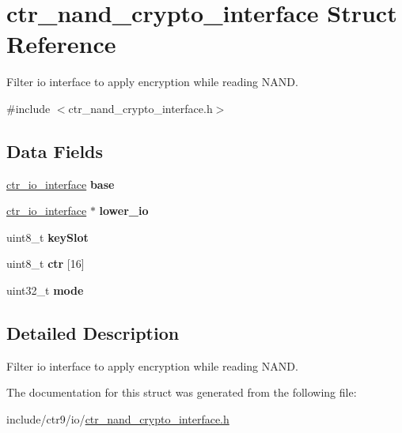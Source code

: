 \hypertarget{structctr__nand__crypto__interface}{}\section{ctr\+\_\+nand\+\_\+crypto\+\_\+interface Struct Reference}
\label{structctr__nand__crypto__interface}


Filter io interface to apply encryption while reading N\+A\+ND.  




{\ttfamily \#include $<$ctr\+\_\+nand\+\_\+crypto\+\_\+interface.\+h$>$}

\subsection*{Data Fields}
\begin{DoxyCompactItemize}
\item 
\hyperlink{structctr__io__interface}{ctr\+\_\+io\+\_\+interface} {\bfseries base}\hypertarget{structctr__nand__crypto__interface_a00beb8fda8579fcca305932851dc5696}{}\label{structctr__nand__crypto__interface_a00beb8fda8579fcca305932851dc5696}

\item 
\hyperlink{structctr__io__interface}{ctr\+\_\+io\+\_\+interface} $\ast$ {\bfseries lower\+\_\+io}\hypertarget{structctr__nand__crypto__interface_ac9983e8b6543700f100d745d3a94b703}{}\label{structctr__nand__crypto__interface_ac9983e8b6543700f100d745d3a94b703}

\item 
uint8\+\_\+t {\bfseries key\+Slot}\hypertarget{structctr__nand__crypto__interface_acb43bd125f01ea593afffcc15c3309f2}{}\label{structctr__nand__crypto__interface_acb43bd125f01ea593afffcc15c3309f2}

\item 
uint8\+\_\+t {\bfseries ctr} \mbox{[}16\mbox{]}\hypertarget{structctr__nand__crypto__interface_ab1f4bd9288bb760cbfbb5bbb3ee6ed69}{}\label{structctr__nand__crypto__interface_ab1f4bd9288bb760cbfbb5bbb3ee6ed69}

\item 
uint32\+\_\+t {\bfseries mode}\hypertarget{structctr__nand__crypto__interface_a089f09af071d62d3f1650aa904ae8e8c}{}\label{structctr__nand__crypto__interface_a089f09af071d62d3f1650aa904ae8e8c}

\end{DoxyCompactItemize}


\subsection{Detailed Description}
Filter io interface to apply encryption while reading N\+A\+ND. 

The documentation for this struct was generated from the following file\+:\begin{DoxyCompactItemize}
\item 
include/ctr9/io/\hyperlink{ctr__nand__crypto__interface_8h}{ctr\+\_\+nand\+\_\+crypto\+\_\+interface.\+h}\end{DoxyCompactItemize}
